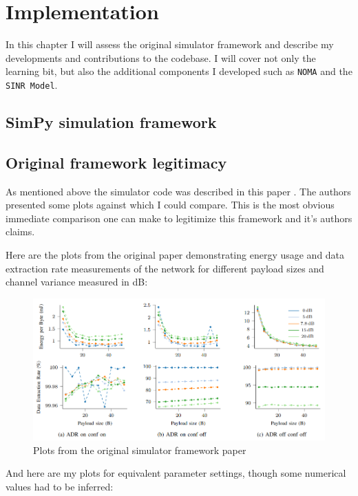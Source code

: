 \chapter{Implementation}

In this chapter I will assess the original simulator framework \cite{simulator_github} and describe my developments and contributions to the codebase. 
I will cover not only the learning bit, but also the 
additional components I developed such as \texttt{NOMA} and the \texttt{SINR Model}. 

\section{SimPy simulation framework}

\section{Original framework legitimacy}
As mentioned above the simulator code was described in this 
paper \cite{simulator}. The authors presented some plots against
which I could compare. This is the most obvious immediate 
comparison one can make to legitimize this framework and it's
authors claims. 

Here are the plots from the original paper demonstrating 
energy usage and data extraction rate measurements of the
network for different payload sizes and channel variance 
measured in dB:

\begin{figure}[h]
\centering
\includegraphics[scale=0.6]{figures/original_plots.PNG}
  \caption{Plots from the original simulator framework paper \cite{simulator}}
  \label{fig:my_sectors}
\end{figure}

And here are my plots for equivalent parameter settings, though
some numerical values had to be inferred:

